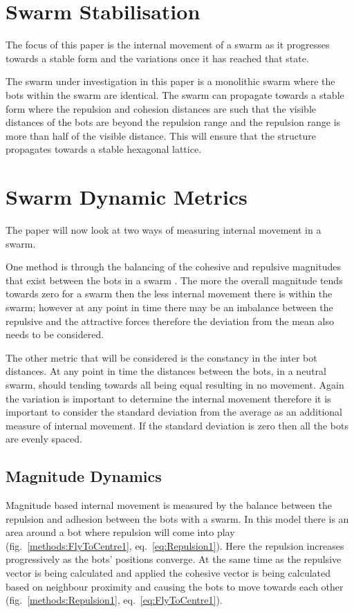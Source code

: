 \documentclass[10pt,journal,letterpaper,twoside]{IEEEtran}
\newcommand{\stability}{internal movement}
\newcommand{\Fig}{fig.}
\newcommand{\Eq}{eq.}
\begin{document}
\section{Swarm Stabilisation\label{section:swarmStabilisation}}
The focus of this paper is the \stability{} of a swarm as it
progresses towards a stable form and the variations once it has
reached that state.

The swarm under investigation in this paper is a monolithic swarm
where the bots within the swarm are identical. The swarm can propagate
towards a stable form where the repulsion and cohesion distances are
such that the visible distances of the bots are beyond the repulsion
range and the repulsion range is more than half of the visible
distance. This will ensure that the structure propagates towards a
stable hexagonal lattice.

\section{Swarm Dynamic Metrics\label{methods:SwarmStability}}
The paper will now look at two ways of measuring \stability{} in a swarm.

One method is through the balancing of the cohesive and repulsive
magnitudes that exist between the bots in a swarm \cite{VGKP11}
\cite{LBMFKV07}. The more the overall magnitude tends towards zero for
a swarm then the less \stability{} there is within the swarm; however
at any point in time there may be an imbalance between the repulsive
and the attractive forces therefore the deviation from the mean also
needs to be considered.

The other metric that will be considered is the constancy in the inter
bot distances. At any point in time the distances between the bots, in
a neutral swarm, should tending towards all being equal resulting in
no movement. Again the variation is important to determine the
\stability{} therefore it is important to consider the standard
deviation from the average as an additional measure of
\stability{}. If the standard deviation is zero then all the bots are
evenly spaced.

\subsection{Magnitude Dynamics}

Magnitude based \stability{} is measured by the balance between the
repulsion and adhesion between the bots with a swarm. In this model
there is an area around a bot where repulsion will come into play
(\Fig{}~\ref{methods:FlyToCentre1}, \Eq{}~\ref{eq:Repulsion1}).  Here
the repulsion increases progressively as the bots' positions
converge. At the same time as the repulsive vector is being calculated
and applied the cohesive vector is being calculated based on neighbour
proximity and causing the bots to move towards each other
(\Fig{}~\ref{methods:Repulsion1}, \Eq{}~\ref{eq:FlyToCentre1}).
\end{document}
